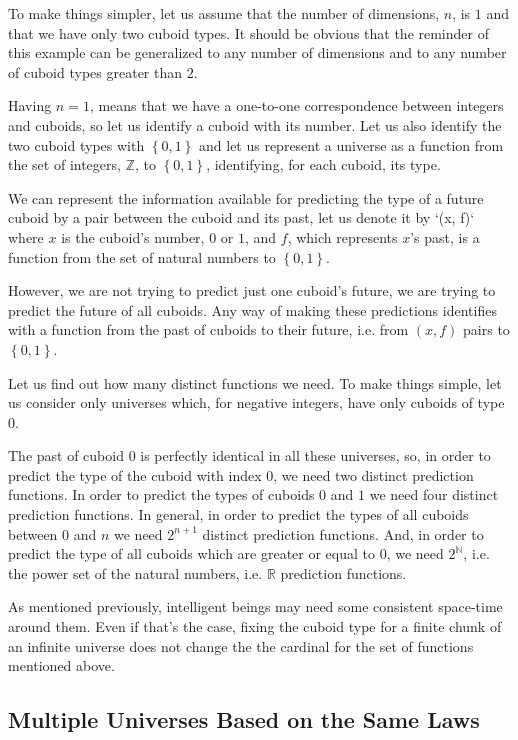 \documentclass[a4paper
,draft
]{article}
\def\reale{\mathbb{R}}
\def\intregi{\mathbb{Z}}
\def\naturale{\mathbb{N}}
\newcommand{\multime}[1]{\left\{ #1 \right\}}
\begin{document}
To make things simpler, let us assume that the number of dimensions, $n$,
is $1$ and that we have only two cuboid types.
It should be obvious that
the reminder of this example can be generalized to any number of dimensions
and to any number of cuboid types greater than $2$.

Having $n=1$, means that we have a one-to-one correspondence between
integers and cuboids, so let us identify a cuboid with its number.
Let us also identify the two cuboid types with $\multime{0, 1}$ and
let us represent a universe as a function from the set of integers, $\intregi$,
to $\multime{0, 1}$, identifying, for each cuboid, its type.

We can represent the information available for predicting the type of a future
cuboid by a pair between the cuboid and its past, let us denote it
by `(x, f)` where $x$ is the cuboid's number, $0$ or $1$,
and $f$, which represents $x$'s past, is a function from the set of natural
numbers to $\multime{0,1}$.

However, we are not trying to predict just one cuboid's future,
we are trying to predict the future of all cuboids.
Any way of making these predictions identifies with a function from the past
of cuboids to their future, i.e. from $(x, f)$ pairs to $\multime{0, 1}$.

Let us find out how many distinct functions we need.
To make things simple, let us consider only universes which, for negative
integers, have only cuboids of type $0$.

The past of cuboid $0$ is perfectly identical in all these universes, so,
in order to predict the type of the cuboid with index $0$,
we need two distinct prediction functions.
In order to predict the types of cuboids $0$ and $1$ we need four
distinct prediction functions.
In general, in order to predict the types of all cuboids between $0$ and $n$
we need $2^{n+1}$ distinct prediction functions.
And, in order to predict the type of all cuboids which are greater or equal
to $0$, we need $2^\naturale$, i.e. the power set of the natural numbers,
i.e. $\reale$ prediction functions.

As mentioned previously, intelligent beings may need some consistent space-time
around them. Even if that's the case, fixing the cuboid type for a finite
chunk of an infinite universe does not change the the cardinal for the set of
functions mentioned above.

\subsection {Multiple Universes Based on the Same Laws}
\end{document}
